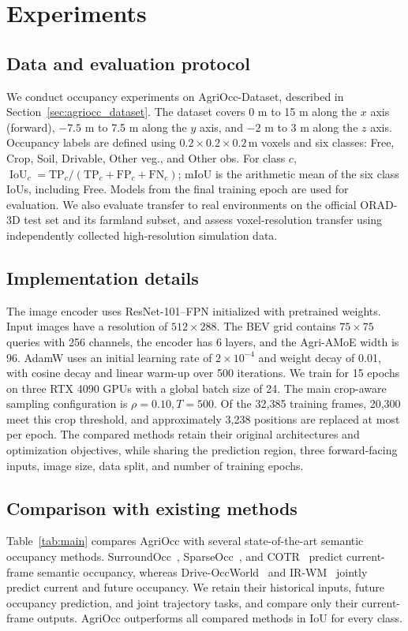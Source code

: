 \documentclass[a4paper,fleqn]{cas-sc}
\newcommand{\IoU}{\operatorname{IoU}}
\begin{document}
\section{Experiments}\label{sec:experiments}
\subsection{Data and evaluation protocol}\label{sec:data}
We conduct occupancy experiments on AgriOcc-Dataset, described in Section~\ref{sec:agriocc_dataset}.
The dataset covers 0 m to 15 m along the $x$ axis (forward), $-7.5$ m to 7.5 m along the $y$ axis, and $-2$ m to 3 m along the $z$ axis.
Occupancy labels are defined using $0.2\times0.2\times0.2\,\mathrm{m}$ voxels and six classes: Free, Crop, Soil, Drivable, Other veg., and Other obs.
For class $c$, $\IoU_c=\mathrm{TP}_c/(\mathrm{TP}_c+\mathrm{FP}_c+\mathrm{FN}_c)$; mIoU is the arithmetic mean of the six class IoUs, including Free.
Models from the final training epoch are used for evaluation.
We also evaluate transfer to real environments on the official ORAD-3D test set and its farmland subset, and assess voxel-resolution transfer using independently collected high-resolution simulation data.

\subsection{Implementation details}\label{sec:implementation}
The image encoder uses ResNet-101--FPN initialized with pretrained weights.
Input images have a resolution of $512\times288$. The BEV grid contains $75\times75$ queries with 256 channels, the encoder has 6 layers, and the Agri-AMoE width is 96.
AdamW uses an initial learning rate of $2\times10^{-4}$ and weight decay of 0.01, with cosine decay and linear warm-up over 500 iterations.
We train for 15 epochs on three RTX 4090 GPUs with a global batch size of 24. The main crop-aware sampling configuration is $\rho=0.10,T=500$.
Of the 32,385 training frames, 20,300 meet this crop threshold, and approximately 3,238 positions are replaced at most per epoch.
The compared methods retain their original architectures and optimization objectives, while sharing the prediction region, three forward-facing inputs, image size, data split, and number of training epochs.

\subsection{Comparison with existing methods}\label{sec:comparison}
Table~\ref{tab:main} compares AgriOcc with several state-of-the-art semantic occupancy methods.
SurroundOcc~\citep{wei2023surroundocc}, SparseOcc~\citep{tang2024sparseocc}, and COTR~\citep{ma2024cotr} predict current-frame semantic occupancy, whereas Drive-OccWorld~\citep{yangDrivingOccupancyWorld2025} and IR-WM~\citep{mei2025irwm} jointly predict current and future occupancy.
We retain their historical inputs, future occupancy prediction, and joint trajectory tasks, and compare only their current-frame outputs.
AgriOcc outperforms all compared methods in IoU for every class.
\end{document}
